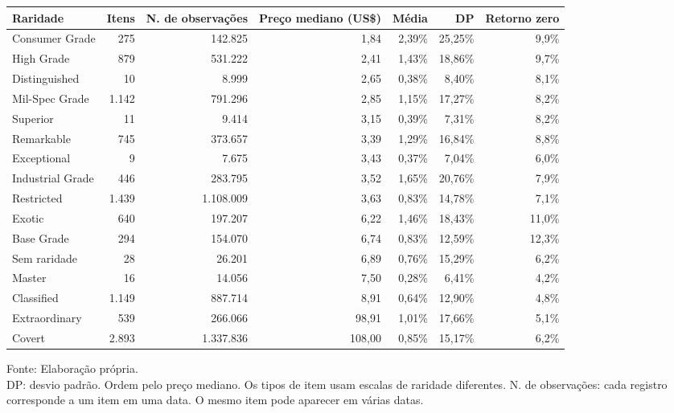 \begingroup
\setlength{}
\setlength{}
\fontsize{8.0pt}{9.6pt}\selectfont

\setlength{\LTpost}{0mm}
\begin{longtable}{@{\extracolsep{\fill}}lrrrrrr}

\toprule
\textbf{Raridade} & \textbf{Itens} & \textbf{N. de observações} & \textbf{Preço mediano (US\$)} & \textbf{Média} & \textbf{DP} & \textbf{Retorno zero} \\ 
\midrule\addlinespace[2.5pt]
Consumer Grade & 275 & 142.825 & 1,84 & 2,39\% & 25,25\% & 9,9\% \\
High Grade & 879 & 531.222 & 2,41 & 1,43\% & 18,86\% & 9,7\% \\
Distinguished & 10 & 8.999 & 2,65 & 0,38\% & 8,40\% & 8,1\% \\
Mil-Spec Grade & 1.142 & 791.296 & 2,85 & 1,15\% & 17,27\% & 8,2\% \\
Superior & 11 & 9.414 & 3,15 & 0,39\% & 7,31\% & 8,2\% \\
Remarkable & 745 & 373.657 & 3,39 & 1,29\% & 16,84\% & 8,8\% \\
Exceptional & 9 & 7.675 & 3,43 & 0,37\% & 7,04\% & 6,0\% \\
Industrial Grade & 446 & 283.795 & 3,52 & 1,65\% & 20,76\% & 7,9\% \\
Restricted & 1.439 & 1.108.009 & 3,63 & 0,83\% & 14,78\% & 7,1\% \\
Exotic & 640 & 197.207 & 6,22 & 1,46\% & 18,43\% & 11,0\% \\
Base Grade & 294 & 154.070 & 6,74 & 0,83\% & 12,59\% & 12,3\% \\
Sem raridade & 28 & 26.201 & 6,89 & 0,76\% & 15,29\% & 6,2\% \\
Master & 16 & 14.056 & 7,50 & 0,28\% & 6,41\% & 4,2\% \\
Classified & 1.149 & 887.714 & 8,91 & 0,64\% & 12,90\% & 4,8\% \\
Extraordinary & 539 & 266.066 & 98,91 & 1,01\% & 17,66\% & 5,1\% \\
Covert & 2.893 & 1.337.836 & 108,00 & 0,85\% & 15,17\% & 6,2\% \\
\bottomrule
\end{longtable}
\begin{minipage}{\linewidth}
Fonte: Elaboração própria.\\
DP: desvio padrão. Ordem pelo preço mediano. Os tipos de item usam escalas de raridade diferentes. N. de observações: cada registro corresponde a um item em uma data. O mesmo item pode aparecer em várias datas.\\
\end{minipage}
\endgroup

